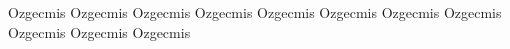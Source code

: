  Ozgecmis Ozgecmis
 Ozgecmis
 Ozgecmis
 Ozgecmis
 Ozgecmis
 Ozgecmis
 Ozgecmis
 Ozgecmis
 Ozgecmis
 Ozgecmis
